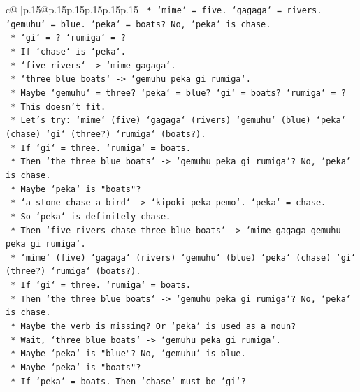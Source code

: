 \documentclass{article}
\begin{document}
{\begin{supertabular}{c@{$\;$}|p{.15\linewidth}@{}p{.15\linewidth}p{.15\linewidth}p{.15\linewidth}p{.15\linewidth}p{.15\linewidth}}
{{{\texttt{            *   `mime` = five. `gagaga` = rivers. `gemuhu` = blue. `peka` = boats? No, `peka` is chase.} \\
\texttt{            *   `gi` = ? `rumiga` = ?} \\
\texttt{            *   If `chase` is `peka`.} \\
\texttt{            *   `five rivers` {-}> `mime gagaga`.} \\
\texttt{            *   `three blue boats` {-}> `gemuhu peka gi rumiga`.} \\
\texttt{            *   Maybe `gemuhu` = three? `peka` = blue? `gi` = boats? `rumiga` = ?} \\
\texttt{            *   This doesn't fit.} \\
\texttt{            *   Let's try: `mime` (five) `gagaga` (rivers) `gemuhu` (blue) `peka` (chase) `gi` (three?) `rumiga` (boats?).} \\
\texttt{            *   If `gi` = three. `rumiga` = boats.} \\
\texttt{            *   Then `the three blue boats` {-}> `gemuhu peka gi rumiga`? No, `peka` is chase.} \\
\texttt{            *   Maybe `peka` is "boats"?} \\
\texttt{            *   `a stone chase a bird` {-}> `kipoki peka pemo`. `peka` = chase.} \\
\texttt{            *   So `peka` is definitely chase.} \\
\texttt{            *   Then `five rivers chase three blue boats` {-}> `mime gagaga gemuhu peka gi rumiga`.} \\
\texttt{            *   `mime` (five) `gagaga` (rivers) `gemuhu` (blue) `peka` (chase) `gi` (three?) `rumiga` (boats?).} \\
\texttt{            *   If `gi` = three. `rumiga` = boats.} \\
\texttt{            *   Then `the three blue boats` {-}> `gemuhu peka gi rumiga`? No, `peka` is chase.} \\
\texttt{            *   Maybe the verb is missing? Or `peka` is used as a noun?} \\
\texttt{            *   Wait, `three blue boats` {-}> `gemuhu peka gi rumiga`.} \\
\texttt{            *   Maybe `peka` is "blue"? No, `gemuhu` is blue.} \\
\texttt{            *   Maybe `peka` is "boats"?} \\
\texttt{            *   If `peka` = boats. Then `chase` must be `gi`?} \\
}}}
\end{supertabular}}
\end{document}
